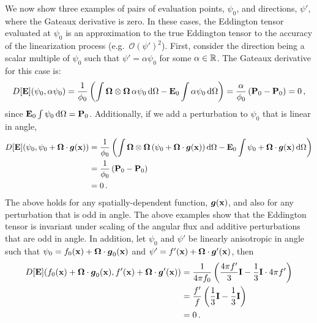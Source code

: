\documentclass[../doc.tex]{subfiles}
\begin{document}
We now show three examples of pairs of evaluation points, $\psi_0$, and directions, $\psi'$, where the Gateaux derivative is zero. In these cases, the Eddington tensor evaluated at $\psi_0$ is an approximation to the true Eddington tensor to the accuracy of the linearization process (e.g.~$\mathcal{O}(\psi')^2$). 
First, consider the direction being a scalar multiple of $\psi_0$ such that $\psi' = \alpha \psi_0$ for some $\alpha \in \mathbb{R}$. The Gateaux derivative for this case is: 
	\begin{equation}
		D[\boldsymbol{\mathrm{E}}](\psi_0,\alpha\psi_0) = \frac{1}{\phi_0}\left( \int \boldsymbol{\Omega}\otimes\boldsymbol{\Omega}\,\alpha\psi_0 \mathop{}\!\mathrm{d}\Omega - \boldsymbol{\mathrm{E}}_0 \int \alpha \psi_0 \mathop{}\!\mathrm{d} \Omega \right) = \frac{\alpha}{\phi_0}\left( \boldsymbol{\mathrm{P}}_0 - \boldsymbol{\mathrm{P}}_0 \right) = 0 \,,
	\end{equation}
since $\boldsymbol{\mathrm{E}}_0 \int \psi_0 \mathop{}\!\mathrm{d} \Omega = \boldsymbol{\mathrm{P}}_0$. 
Additionally, if we add a perturbation to $\psi_0$ that is linear in angle, 
	\begin{equation}
	\begin{aligned}
		D[\boldsymbol{\mathrm{E}}](\psi_0, \psi_0 + \boldsymbol{\Omega}\cdot\boldsymbol{g}(\boldsymbol{\mathrm{x}})) &= \frac{1}{\phi_0}\left( \int \boldsymbol{\Omega}\otimes\boldsymbol{\Omega}\left( \psi_0 + \boldsymbol{\Omega}\cdot\boldsymbol{g}(\boldsymbol{\mathrm{x}}) \right)\mathop{}\!\mathrm{d} \Omega - \boldsymbol{\mathrm{E}}_0 \int \psi_0 + \boldsymbol{\Omega}\cdot\boldsymbol{g}(\boldsymbol{\mathrm{x}}) \mathop{}\!\mathrm{d} \Omega \right)\\
		&= \frac{1}{\phi_0} \left( \boldsymbol{\mathrm{P}}_0 - \boldsymbol{\mathrm{P}}_0 \right) \\
		&= 0 \,. 
	\end{aligned}
	\end{equation}
The above holds for any spatially-dependent function, $\boldsymbol{g}(\boldsymbol{\mathrm{x}})$, and also for any perturbation that is odd in angle. 
The above examples show that the Eddington tensor is invariant under scaling of the angular flux and additive perturbations that are odd in angle. In addition, let $\psi_0$ and $\psi'$ be linearly anisotropic in angle such that $\psi_0 = f_0(\boldsymbol{\mathrm{x}}) + \boldsymbol{\Omega}\cdot\boldsymbol{g}_0(\boldsymbol{\mathrm{x}})$ and $\psi' = f'(\boldsymbol{\mathrm{x}}) + \boldsymbol{\Omega}\cdot\boldsymbol{g}'(\boldsymbol{\mathrm{x}})$, then 
	\begin{equation}
	\begin{aligned}
		D[\boldsymbol{\mathrm{E}}](f_0(\boldsymbol{\mathrm{x}}) + \boldsymbol{\Omega}\cdot\boldsymbol{g}_0(\boldsymbol{\mathrm{x}}), f'(\boldsymbol{\mathrm{x}}) + \boldsymbol{\Omega}\cdot\boldsymbol{g}'(\boldsymbol{\mathrm{x}})) &= \frac{1}{4\pi f_0}\left( \frac{4\pi f'}{3}\boldsymbol{\mathrm{I}} - \frac{1}{3}\boldsymbol{\mathrm{I}} \cdot 4\pi f' \right) \\
		&= \frac{f'}{f}\left( \frac{1}{3}\boldsymbol{\mathrm{I}} - \frac{1}{3}\boldsymbol{\mathrm{I}} \right) \\
		&= 0 \,. 
	\end{aligned}
	\end{equation}
\end{document}
